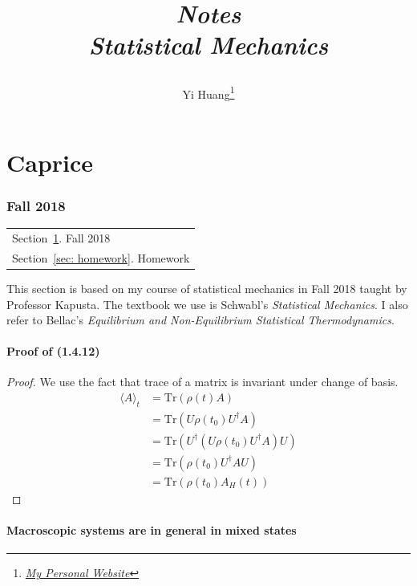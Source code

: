\documentclass[10pt]{article}
\title{\begin{center}{\Huge \textit{Notes}}\\{{\itshape Statistical Mechanics}}\end{center}}
\author{Yi Huang\footnote{\href{https://yiihuang.com/}{\textit{My Personal Website}}}}
\affiliation{
University of Minnesota
}
\begin{document}
	\maketitle
	\flushbottom
	\newpage
	\pagestyle{fancynotes}
	\part{Caprice}
	\section{Fall 2018}\label{sec: fall2018}
	\begin{margintable}\vspace{.8in}\footnotesize
		\begin{tabularx}{\marginparwidth}{|X}
			Section~\ref{sec: fall2018}. Fall 2018\\
			Section~\ref{sec: homework}. Homework\\
		\end{tabularx}
	\end{margintable}

	This section is based on my course of statistical mechanics in Fall 2018 taught by Professor Kapusta. The textbook we use is Schwabl's \textit{Statistical Mechanics}. I also refer to Bellac's \textit{Equilibrium and Non-Equilibrium Statistical Thermodynamics}.

\subsection{Proof of (1.4.12)}
\begin{proof}
	We use the fact that trace of a matrix is invariant under change of basis.
	\begin{align*}
	\langle A \rangle_t &= \mathrm{Tr}(\rho(t) A) \\
	&= \mathrm{Tr}(U \rho(t_0) U^{\dagger} A) \\
	&= \mathrm{Tr}(U^{\dagger} (U \rho(t_0) U^{\dagger} A) U) \\
	&= \mathrm{Tr}(\rho(t_0) U^{\dagger} A U) \\
	&= \mathrm{Tr}(\rho(t_0) A_H(t))
	\end{align*}
\end{proof}

\subsection{Macroscopic systems are in general in mixed states}
\end{document}
